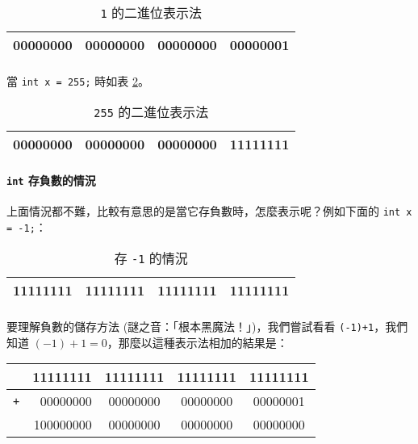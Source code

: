 \documentclass[12pt,a4paper,oneside]{article}
\begin{document}
\begin{CJK}{UTF8}{bkai}
\begin{table}[h!]
\centering
\begin{tabular}{|c|c|c|c|}
\hline
{\color{red}0}0000000 & 00000000 & 00000000 & 0000000{\color{red}1}\\
\hline
\end{tabular}
\caption{\lstinline!1! 的二進位表示法}
\label{basic:cpp:table:binary:1}
\end{table}

\paragraph{}當 \lstinline!int x = 255;! 時如表 \ref{basic:cpp:table:binary:255}。

\begin{table}[h!]
\centering
\begin{tabular}{|c|c|c|c|}
\hline
{\color{red}0}0000000 & 00000000 & 00000000 & {\color{red}11111111}\\
\hline
\end{tabular}
\caption{\lstinline!255! 的二進位表示法}
\label{basic:cpp:table:binary:255}
\end{table}

\paragraph{\lstinline!int! 存負數的情況}上面情況都不難，比較有意思的是當它存負數時，怎麼表示呢？例如下面的 \lstinline!int x = -1;!：

\begin{table}[h!]
\centering
\begin{tabular}{|c|c|c|c|}
\hline
\textbf{1}1111111 & 11111111 & 11111111 & 11111111\\
\hline
\end{tabular}
\caption{存 \lstinline!-1! 的情況}
\label{basic:cpp:table:int:-1}
\end{table}

\paragraph{}要理解負數的儲存方法 (謎之音：「根本黑魔法！」)，我們嘗試看看 \lstinline!(-1)+1!，我們知道 $(-1)+1=0$，那麼以這種表示法相加的結果是：

\begin{table}[h!]
\centering
\begin{tabular}{|c|r|c|c|c|}
\hline
 & 11111111 & 11111111 & 11111111 & 11111111\\
\hline
\lstinline!+! & 00000000 & 00000000 & 00000000 & 00000001\\
\hline
\hline
 & {\color{red}1}00000000 & 00000000 & 00000000 & 00000000\\
\hline
\end{tabular}
\end{table}


\end{CJK}
\end{document}
